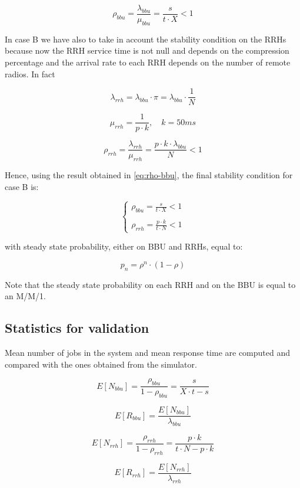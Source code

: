 \documentclass[11pt,a4paper,oneside, openright]{article}
\begin{document}
\begin{equation} \label{eq:rho-bbu}
\rho_{bbu} = \frac{\lambda_{bbu}}{\mu_{bbu}} = \frac{s}{t \cdot X} < 1
\end{equation}

In case B we have also to take in account the stability condition on the RRHs because now the RRH service time is not null and depends on the compression percentage and the arrival rate to each RRH depends on the number of remote radios. In fact

$$ \lambda_{rrh} = \lambda_{bbu} \cdot \pi = \lambda_{bbu} \cdot \frac{1}{N} $$

$$ \mu_{rrh} = \frac{1}{p \cdot k}, \quad k = 50ms $$

\begin{equation}
\rho_{rrh} = \frac{\lambda_{rrh}}{\mu_{rrh}} = \frac{p \cdot k \cdot \lambda_{bbu}}{N} < 1
\end{equation}

Hence, using the result obtained in \eqref{eq:rho-bbu}, the final stability condition for case B is:

$$ \begin{cases} \rho_{bbu} = \frac{s}{t \cdot X} < 1 \\ \\ \rho_{rrh} = \frac{p \cdot k}{t \cdot N} < 1 \end{cases} $$

with steady state probability, either on BBU and RRHs, equal to:

$$ p_{n} = \rho^n \cdot (1 - \rho) $$

Note that the steady state probability on each RRH and on the BBU is equal to an M/M/1.


\subsection{Statistics for validation}
Mean number of jobs in the system and mean response time are computed and compared with the ones obtained from the simulator.

$$ E[N_{bbu}] = \frac{\rho_{bbu}}{1 - \rho_{bbu}} = \frac{s}{X \cdot t - s}$$

$$ E[R_{bbu}] = \frac{E[N_{bbu}]}{\lambda_{bbu}} $$

$$ E[N_{rrh}] = \frac{\rho_{rrh}}{1 - \rho_{rrh}} = \frac{p \cdot k}{t \cdot N - p \cdot k}$$

$$ E[R_{rrh}] = \frac{E[N_{rrh}]}{\lambda_{rrh}} $$
\end{document}
